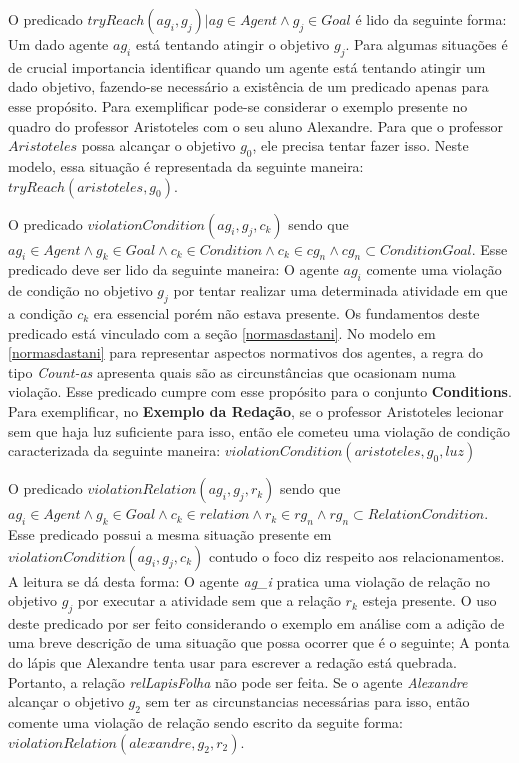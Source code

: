 O predicado $tryReach(ag_i,g_j) | ag \in Agent \wedge g_j \in Goal $ é lido da seguinte forma: Um dado agente $ag_i$ está tentando 
atingir o objetivo $g_j$. Para algumas situações é de crucial importancia identificar quando um agente está tentando atingir um 
dado objetivo, fazendo-se necessário a existência de um predicado apenas para esse propósito. Para exemplificar pode-se considerar 
o exemplo presente no quadro do professor Aristoteles com o seu aluno Alexandre. Para que o professor $Aristoteles$ possa alcançar 
o objetivo $g_0$, ele precisa tentar fazer isso. Neste modelo, essa situação é representada da seguinte maneira: $tryReach(aristoteles,g_0)$.

O predicado $ violationCondition(ag_i,g_j,c_k) $ sendo que 
$ ag_i \in Agent \wedge g_k \in Goal \wedge c_k \in Condition \wedge c_k  \in cg_n \wedge cg_n \subset ConditionGoal $. Esse predicado
deve ser lido da seguinte maneira: O agente $ag_i$ comente uma violação de condição no objetivo $g_j$ por tentar realizar uma determinada
atividade em que a condição $c_k$ era essencial porém não estava presente. Os fundamentos deste predicado está vinculado com a seção \ref{normasdastani}.
No modelo em \ref{normasdastani} para representar aspectos normativos dos agentes, a regra do tipo \textit{Count-as} apresenta 
quais são as circunstâncias que ocasionam numa violação. Esse predicado cumpre com esse propósito para o conjunto \textbf{Conditions}. 
Para exemplificar, no \textbf{Exemplo da Redação}, se o professor Aristoteles lecionar sem que haja luz suficiente para isso, 
então ele cometeu uma violação de condição caracterizada da seguinte maneira: $violationCondition(aristoteles,g_0,luz)$

O predicado $ violationRelation(ag_i,g_j,r_k) $ sendo que $ ag_i \in Agent \wedge g_k \in Goal \wedge c_k \in relation \wedge r_k  \in rg_n \wedge rg_n \subset RelationCondition $.
Esse predicado possui a mesma situação presente em $ violationCondition(ag_i,g_j,c_k) $ contudo o foco diz respeito aos relacionamentos.
A leitura se dá desta forma: O agente \textit{ag\_i} pratica uma violação de relação no objetivo $g_j$ por executar a atividade 
sem que a relação $r_k$ esteja presente. O uso deste predicado por ser feito considerando o exemplo em análise com a adição de uma breve 
descrição de uma situação que possa ocorrer que é o seguinte; A ponta do lápis que Alexandre tenta usar para escrever a redação está 
quebrada. Portanto, a relação \textit{relLapisFolha} não pode ser feita. Se o agente \textit{Alexandre} alcançar o objetivo $g_2$ sem ter 
as circunstancias necessárias para isso, então comente uma violação de relação sendo escrito da seguite forma: $violationRelation(alexandre,g_2,r_2)$.


